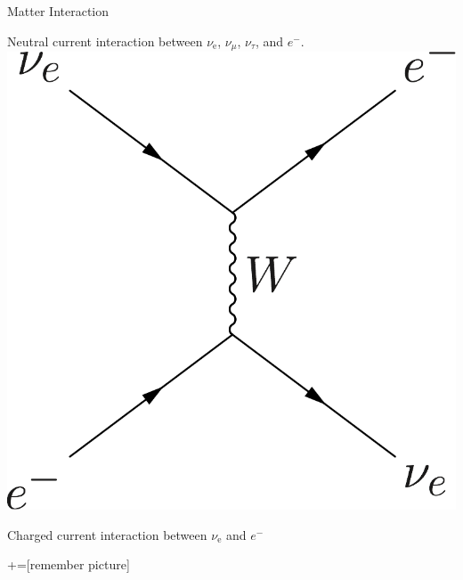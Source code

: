 \begin{frame}{Matter Interaction}
\begin{tcolorbox}[sidebyside]
\color{black}Neutral current interaction between $\nu_{\mathrm e}$, $\nu_{\mu}$, $\nu_{\tau}$,
and $e^{-}$.
\tcblower
\centering
\includegraphics[height=0.32\textheight]{assets/charged-current.png}

\color{black}Charged current interaction between $\nu_{\mathrm e}$ and $e^{-}$
\end{tcolorbox}


\end{frame}





+=[remember picture]


\everymath{\displaystyle}








